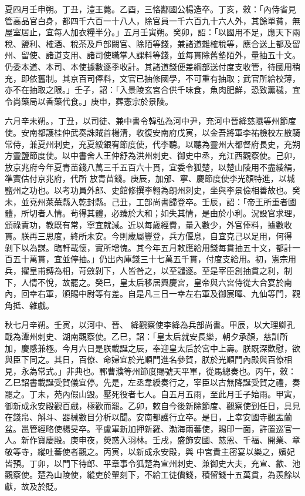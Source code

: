 \begin{pinyinscope}
 夏四月壬申朔。丁丑，澧王薨。乙酉，三恪酅國公楊造卒。丁亥，敕：「內侍省見管高品官白身，都四千六百一十八人，除官員一千六百九十六人外，其餘單貧，無屋室居止，宜每人加衣糧半分。」五月壬寅朔。癸卯，詔：「以國用不足，應天下兩
 稅、鹽利、榷酒、稅茶及戶部闕官、除陌等錢，兼諸道雜榷稅等，應合送上都及留州、留使、諸道支用、諸司使職掌人課料等錢，並每貫除舊墊陌外，量抽五十文。仍委本道、本司、本使據數逐季收計。其諸道錢便差綱部送付度支收管，待國用稍充，即依舊制。其京百司俸料，文官已抽修國學，不可重有抽取；武官所給校薄，亦不在抽取之限。」壬子，詔：「入景陵玄宮合供千味食，魚肉肥鮮，恐致薰穢，宜令尚藥局以香藥代食。」庚申，葬憲宗於景陵。



 六月辛未朔。，丁丑，以司徒、兼中書令韓弘為河中尹，充河中晉絳慈隰等州節度使。安南都護桂仲武奏誅賊首楊清，收復安南府戊寅，以金吾將軍李祐檢校左散騎常侍，兼夏州刺史，充夏綏銀宥節度使，代李聽。以聽為靈州大都督府長史，充朔方靈鹽節度使。以中書舍人王仲舒為洪州刺史、御史中丞，充江西觀察使。己卯，放京兆府今年夏青苗錢八萬三千五百六十貫，宜委令狐楚，以楚山陵用不盡綾絹，準實估付京兆府，代所
 放青苗錢。庚辰，加邠、寧、慶節度使李光顏特進，以城鹽州之功也。以考功員外郎、史館修撰李翱為朗州刺史，坐與李景儉相善故也。癸未，並兗州萊蕪縣入乾封縣。己丑，工部尚書歸登卒。壬辰，詔：「帝王所重者國體，所切者人情。茍得其體，必臻於大和；如失其情，是由於小利。況設官求理，頒祿責功，教既有常，寧宜就減。近以每歲經費，量入數少，外官俸料，據數收貫。朕再三思度，終所未安。今則歲屬豐登，兵方偃息，自宜克己以足用，何得
 剝下以為謀。臨軒載懷，實所增愧。其今年五月敕應給用錢每貫抽五十文，都計一百五十萬貫，宜並停抽。」仍出內庫錢三十七萬五千貫，付度支給用。初，憲宗用兵，擢皇甫鎛為相，苛斂剝下，人皆咎之，以至譴逐。至是宰臣創抽貫之利，制下，人情不悅，故罷之。癸巳，皇太后移居興慶宮，皇帝與六宮侍從大合宴於南內，回幸右軍，頒賜中尉等有差。自是凡三日一幸左右軍及御宸暉、九仙等門，觀角抵、雜戲。



 秋七月辛朔。壬寅，以河中、晉、
 絳觀察使李絳為兵部尚書。甲辰，以大理卿孔戢為潭州刺史、湖南觀察使。乙巳，詔：「皇太后就安長樂，朝夕承顏，慈訓所加，慶感兼極。今月六日是朕載誕之辰，奉迎皇太后於宮中上壽。朕既深歡慰，欲與臣下同之。其日，百僚、命婦宜於光順門進名參賀，朕於光順門內殿與百僚相見，永為常式。」非典也。鄆曹濮等州節度賜號天平軍，從馬總奏也。丙午，敕：乙巳詔書載誕受賀儀宜停。先是，左丞韋綬奏行之，宰臣以古無降誕受賀之禮，奏
 罷之。丁未，苑內假山毀。壓死役者七人。自五月五雨，至此月壬子始雨。甲寅，御新成永安殿觀百戲，極歡而罷。乙卯，敕自今後新除節度、觀察使到任日，具見在錢帛、斛斗、器械數目分析以聞。安南都護行立卒。是日，上幸安國寺觀盂蘭盆。邕管經略使楊旻卒。平盧軍新加押新羅、渤海兩蕃使，賜印一面，許置巡官一人。新作寶慶殿。庚申夜，熒惑入羽林。壬戌，盛飾安國、慈恩、千福、開業、章敬等寺，縱吐蕃使者觀之。丙寅，以新成永安殿，與
 中宮貴主密宴以樂之，嬪妃皆預。丁卯，以門下待郎、平章事令狐楚為宣州刺史、兼御史大夫，充宣、歙、池觀察使。楚為山陵使，縱吏於翬刻下，不給工徒價錢，積留錢十五萬貫，為羨餘以獻，故及於貶。




\end{pinyinscope}
